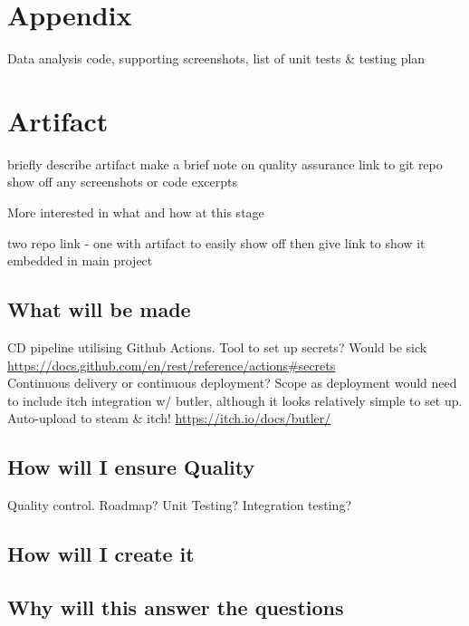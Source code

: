 \documentclass[lettersize,journal]{IEEEtran}
\begin{document}
    \section{Appendix}
    Data analysis code, supporting screenshots, list of unit tests \& testing plan

\section{Artifact}
    briefly describe artifact
    make a brief note on quality assurance
    link to git repo
    show off any screenshots or code excerpts

    More interested in what and how at this stage

    two repo link - one with artifact to easily show off then give link to show it embedded in main project
    \subsection{What will be made}
        CD pipeline utilising Github Actions. Tool to set up secrets? Would be sick \url{https://docs.github.com/en/rest/reference/actions#secrets} \\
        Continuous delivery or continuous deployment? Scope as deployment would need to include itch integration w/ butler, although it looks relatively simple to set up.
        Auto-upload to steam \& itch! \url{https://itch.io/docs/butler/}

    \subsection{How will I ensure Quality}
        Quality control. Roadmap? Unit Testing? Integration testing?

    \subsection{How will I create it}

    \subsection{Why will this answer the questions}



\end{document}
